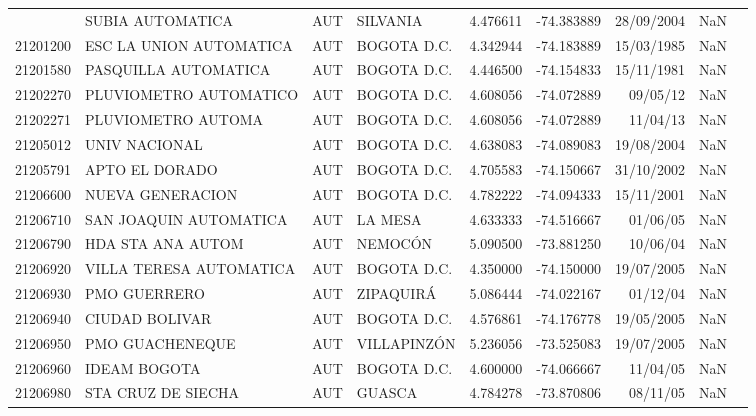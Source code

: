 \begin{landscape}
\begin{longtable}{lp{4cm}lp{3cm}lrrll}
\bottomrule
\endlastfoot
    21195160 &            SUBIA AUTOMATICA &  AUT &          SILVANIA &  4.476611 & -74.383889 &  28/09/2004 &         NaN \\
   21201200 &     ESC LA UNION AUTOMATICA &  AUT &       BOGOTA D.C. &  4.342944 & -74.183889 &  15/03/1985 &         NaN \\
   21201580 &        PASQUILLA AUTOMATICA &  AUT &       BOGOTA D.C. &  4.446500 & -74.154833 &  15/11/1981 &         NaN \\
   21202270 &      PLUVIOMETRO AUTOMATICO &  AUT &       BOGOTA D.C. &  4.608056 & -74.072889 &    09/05/12 &         NaN \\
   21202271 &          PLUVIOMETRO AUTOMA &  AUT &       BOGOTA D.C. &  4.608056 & -74.072889 &    11/04/13 &         NaN \\
   21205012 &               UNIV NACIONAL &  AUT &       BOGOTA D.C. &  4.638083 & -74.089083 &  19/08/2004 &         NaN \\
   21205791 &              APTO EL DORADO &  AUT &       BOGOTA D.C. &  4.705583 & -74.150667 &  31/10/2002 &         NaN \\
   21206600 &            NUEVA GENERACION &  AUT &       BOGOTA D.C. &  4.782222 & -74.094333 &  15/11/2001 &         NaN \\
   21206710 &      SAN JOAQUIN AUTOMATICA &  AUT &           LA MESA &  4.633333 & -74.516667 &    01/06/05 &         NaN \\
   21206790 &           HDA STA ANA AUTOM &  AUT &           NEMOCÓN &  5.090500 & -73.881250 &    10/06/04 &         NaN \\
   21206920 &     VILLA TERESA AUTOMATICA &  AUT &       BOGOTA D.C. &  4.350000 & -74.150000 &  19/07/2005 &         NaN \\
   21206930 &                PMO GUERRERO &  AUT &         ZIPAQUIRÁ &  5.086444 & -74.022167 &    01/12/04 &         NaN \\
   21206940 &              CIUDAD BOLIVAR &  AUT &       BOGOTA D.C. &  4.576861 & -74.176778 &  19/05/2005 &         NaN \\
   21206950 &             PMO GUACHENEQUE &  AUT &       VILLAPINZÓN &  5.236056 & -73.525083 &  19/07/2005 &         NaN \\
   21206960 &                IDEAM BOGOTA &  AUT &       BOGOTA D.C. &  4.600000 & -74.066667 &    11/04/05 &         NaN \\
   21206980 &          STA CRUZ DE SIECHA &  AUT &            GUASCA &  4.784278 & -73.870806 &    08/11/05 &         NaN \\

\end{longtable}
\end{landscape}
